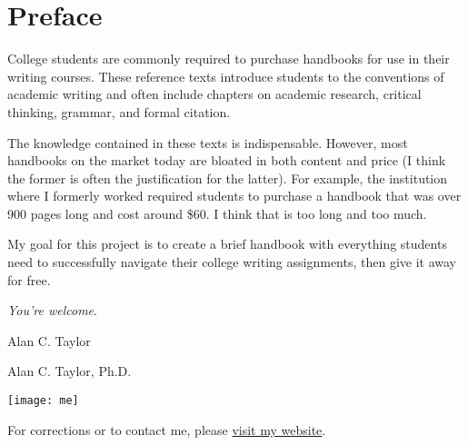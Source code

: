 

\chapter{Preface}

College students are commonly required to purchase handbooks for use in their
writing courses. These reference texts introduce students to the conventions of
academic writing and often include chapters on academic research, critical
thinking, grammar, and formal citation.

The knowledge contained in these texts is indispensable. However, most handbooks
on the market today are bloated in both content and price (I think the former
is often the justification for the latter). For example, the institution where I
formerly worked required students to purchase a handbook that was over 900 pages
long and cost around \$60. I think that is too long and too much.

My goal for this project is to create a brief handbook with everything students
need to successfully navigate their college writing assignments, then give it
away for free.\medskip

\emph{You're welcome}.\bigskip

{\Large\signaturefont Alan C. Taylor}

Alan C. Taylor, Ph.D. 

\newpage 

\vfill

\begin{center}
\texttt{[image: me]} \end{center}

\begin{center} For corrections or to contact me, please \href{http://alan-taylor.org}{visit my website}.\end{center}
